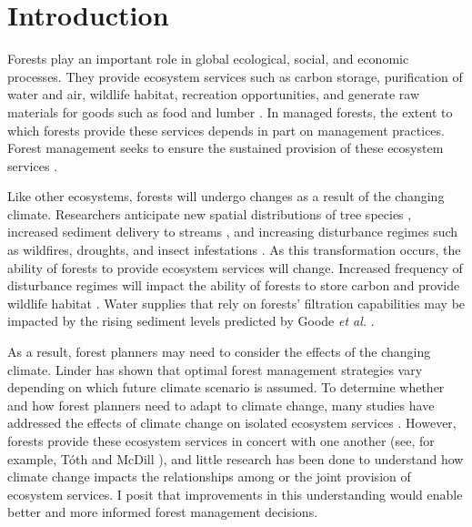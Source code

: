
\section{Introduction}
\label{sec:intro}
 
Forests play an important role in global ecological, social, and economic processes. They provide ecosystem services such as carbon storage, purification of water and air, wildlife habitat, recreation opportunities, and generate raw materials for goods such as food and lumber \cite{daily1997ecosystem}. In managed forests, the extent to which forests provide these services depends in part on management practices. Forest management seeks to ensure the sustained provision of these ecosystem services \cite{cfrForestMgmt}.

Like other ecosystems, forests will undergo changes as a result of the changing climate. Researchers anticipate new spatial distributions of tree species \cite{iverson1998predicting}, increased sediment delivery to streams \cite{Goode20121}, and increasing disturbance regimes such as wildfires, droughts, and insect infestations \cite{vose2012effects}. As this transformation occurs, the ability of forests to provide ecosystem services will change. Increased frequency of disturbance regimes will impact the ability of forests to store carbon \cite{bonan2008forests} and provide wildlife habitat \cite{mckenzie2004climatic}. Water supplies that rely on forests' filtration capabilities may be impacted by the rising sediment levels predicted by Goode \textit{et al.} \cite{Goode20121}.

As a result, forest planners may need to consider the effects of the changing climate. Linder \cite{linder2000developing} has shown that optimal forest management strategies vary depending on which future climate scenario is assumed. To determine whether and how forest planners need to adapt to climate change, many studies have addressed the effects of climate change on isolated ecosystem services \cite{vose2012effects}\cite{bonan2008forests}\cite{mckenzie2004climatic}. However, forests provide these ecosystem services in concert with one another (see, for example, T{\'o}th and McDill \cite{toth2009finding}), and little research has been done to understand how climate change impacts the relationships among or the joint provision of ecosystem services. I posit that improvements in this understanding would enable better and more informed forest management decisions.

